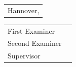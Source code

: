 \begin{titlepage}
\begin{spacing}{1}
			\vspace{5mm}
			
			\begin{tabular}{l}
					\large{Hannover, \Datum}
				\end{tabular}
			
			
			\vspace{5mm}
			{\large
					\begin{tabular}{l l}						
							First Examiner  & \Erstpruefer\\
							Second Examiner & \Zweitpruefer\\
							Supervisor    	& \Betreuer\\
						\end{tabular}
				}
			
		\end{spacing}
\end{titlepage}
